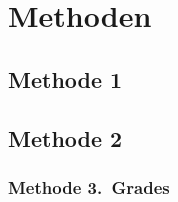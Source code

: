 \section{Methoden}

\lipsum[9]

\subsection{Methode 1}

\lipsum[10]

\subsection{Methode 2}

\lipsum[11]

\subsubsection{Methode 3.~Grades}

\lipsum[15-15]
